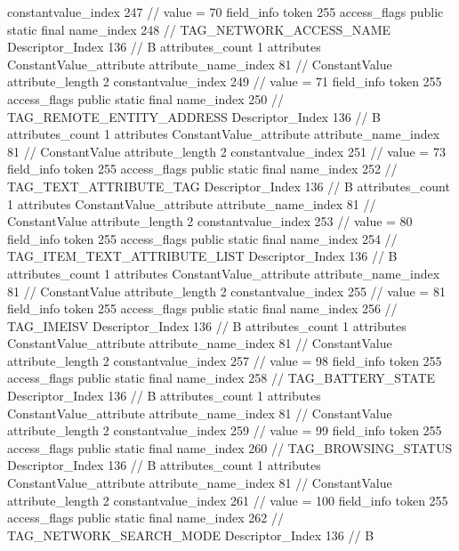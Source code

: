 {{{{{{{					constantvalue_index	247		// value = 70
				}
				}
			}
			field_info {
				token	255
				access_flags	public static final
				name_index	248		// TAG_NETWORK_ACCESS_NAME
				Descriptor_Index	136		// B
				attributes_count	1
				attributes {
				ConstantValue_attribute {
					attribute_name_index	81		// ConstantValue
					attribute_length	2
					constantvalue_index	249		// value = 71
				}
				}
			}
			field_info {
				token	255
				access_flags	public static final
				name_index	250		// TAG_REMOTE_ENTITY_ADDRESS
				Descriptor_Index	136		// B
				attributes_count	1
				attributes {
				ConstantValue_attribute {
					attribute_name_index	81		// ConstantValue
					attribute_length	2
					constantvalue_index	251		// value = 73
				}
				}
			}
			field_info {
				token	255
				access_flags	public static final
				name_index	252		// TAG_TEXT_ATTRIBUTE_TAG
				Descriptor_Index	136		// B
				attributes_count	1
				attributes {
				ConstantValue_attribute {
					attribute_name_index	81		// ConstantValue
					attribute_length	2
					constantvalue_index	253		// value = 80
				}
				}
			}
			field_info {
				token	255
				access_flags	public static final
				name_index	254		// TAG_ITEM_TEXT_ATTRIBUTE_LIST
				Descriptor_Index	136		// B
				attributes_count	1
				attributes {
				ConstantValue_attribute {
					attribute_name_index	81		// ConstantValue
					attribute_length	2
					constantvalue_index	255		// value = 81
				}
				}
			}
			field_info {
				token	255
				access_flags	public static final
				name_index	256		// TAG_IMEISV
				Descriptor_Index	136		// B
				attributes_count	1
				attributes {
				ConstantValue_attribute {
					attribute_name_index	81		// ConstantValue
					attribute_length	2
					constantvalue_index	257		// value = 98
				}
				}
			}
			field_info {
				token	255
				access_flags	public static final
				name_index	258		// TAG_BATTERY_STATE
				Descriptor_Index	136		// B
				attributes_count	1
				attributes {
				ConstantValue_attribute {
					attribute_name_index	81		// ConstantValue
					attribute_length	2
					constantvalue_index	259		// value = 99
				}
				}
			}
			field_info {
				token	255
				access_flags	public static final
				name_index	260		// TAG_BROWSING_STATUS
				Descriptor_Index	136		// B
				attributes_count	1
				attributes {
				ConstantValue_attribute {
					attribute_name_index	81		// ConstantValue
					attribute_length	2
					constantvalue_index	261		// value = 100
				}
				}
			}
			field_info {
				token	255
				access_flags	public static final
				name_index	262		// TAG_NETWORK_SEARCH_MODE
				Descriptor_Index	136		// B
}}}}}
